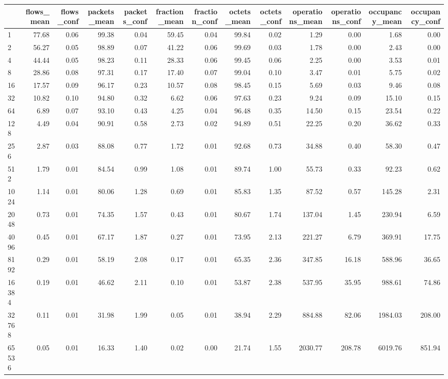 \begin{tabular}{lrrrrrrrrrrrr}
\toprule
 & flows_mean & flows_conf & packets_mean & packets_conf & fraction_mean & fraction_conf & octets_mean & octets_conf & operations_mean & operations_conf & occupancy_mean & occupancy_conf \\
\midrule
1 & 77.68 & 0.06 & 99.38 & 0.04 & 59.45 & 0.04 & 99.84 & 0.02 & 1.29 & 0.00 & 1.68 & 0.00 \\
2 & 56.27 & 0.05 & 98.89 & 0.07 & 41.22 & 0.06 & 99.69 & 0.03 & 1.78 & 0.00 & 2.43 & 0.00 \\
4 & 44.44 & 0.05 & 98.23 & 0.11 & 28.33 & 0.06 & 99.45 & 0.06 & 2.25 & 0.00 & 3.53 & 0.01 \\
8 & 28.86 & 0.08 & 97.31 & 0.17 & 17.40 & 0.07 & 99.04 & 0.10 & 3.47 & 0.01 & 5.75 & 0.02 \\
16 & 17.57 & 0.09 & 96.17 & 0.23 & 10.57 & 0.08 & 98.45 & 0.15 & 5.69 & 0.03 & 9.46 & 0.08 \\
32 & 10.82 & 0.10 & 94.80 & 0.32 & 6.62 & 0.06 & 97.63 & 0.23 & 9.24 & 0.09 & 15.10 & 0.15 \\
64 & 6.89 & 0.07 & 93.10 & 0.43 & 4.25 & 0.04 & 96.48 & 0.35 & 14.50 & 0.15 & 23.54 & 0.22 \\
128 & 4.49 & 0.04 & 90.91 & 0.58 & 2.73 & 0.02 & 94.89 & 0.51 & 22.25 & 0.20 & 36.62 & 0.33 \\
256 & 2.87 & 0.03 & 88.08 & 0.77 & 1.72 & 0.01 & 92.68 & 0.73 & 34.88 & 0.40 & 58.30 & 0.47 \\
512 & 1.79 & 0.01 & 84.54 & 0.99 & 1.08 & 0.01 & 89.74 & 1.00 & 55.73 & 0.33 & 92.23 & 0.62 \\
1024 & 1.14 & 0.01 & 80.06 & 1.28 & 0.69 & 0.01 & 85.83 & 1.35 & 87.52 & 0.57 & 145.28 & 2.31 \\
2048 & 0.73 & 0.01 & 74.35 & 1.57 & 0.43 & 0.01 & 80.67 & 1.74 & 137.04 & 1.45 & 230.94 & 6.59 \\
4096 & 0.45 & 0.01 & 67.17 & 1.87 & 0.27 & 0.01 & 73.95 & 2.13 & 221.27 & 6.79 & 369.91 & 17.75 \\
8192 & 0.29 & 0.01 & 58.19 & 2.08 & 0.17 & 0.01 & 65.35 & 2.36 & 347.85 & 16.18 & 588.96 & 36.65 \\
16384 & 0.19 & 0.01 & 46.62 & 2.11 & 0.10 & 0.01 & 53.87 & 2.38 & 537.95 & 35.95 & 988.61 & 74.86 \\
32768 & 0.11 & 0.01 & 31.98 & 1.99 & 0.05 & 0.01 & 38.94 & 2.29 & 884.88 & 82.06 & 1984.03 & 208.00 \\
65536 & 0.05 & 0.01 & 16.33 & 1.40 & 0.02 & 0.00 & 21.74 & 1.55 & 2030.77 & 208.78 & 6019.76 & 851.94 \\

\end{tabular}
